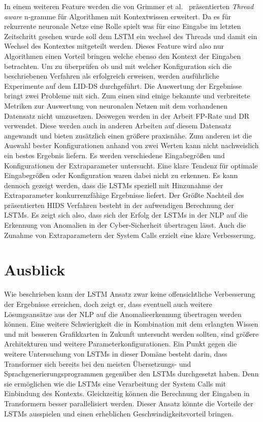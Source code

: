 In einem weiteren Feature werden die von Grimmer et al.~\cite{IDSTHREADGRIMMER2021} präsentierten \textit{Thread aware} n-gramme für Algorithmen mit Kontextwissen erweitert.
Da es für rekurrente neuronale Netze eine Rolle spielt was für eine Eingabe im letzten Zeitschritt gesehen wurde soll dem \ac{LSTM} ein wechsel des Threads und damit ein Wechsel des Kontextes mitgeteilt werden.
Dieses Feature wird also nur Algorithmen einen Vorteil bringen welche ebenso den Kontext der Eingaben betrachten.
Um zu überprüfen ob und mit welcher Konfiguration sich die beschriebenen Verfahren als erfolgreich erweisen, werden ausführliche Experimente auf dem \ac{LID-DS} durchgeführt.
Die Auswertung der Ergebnisse bringt zwei Probleme mit sich.
Zum einen sind einige bekannte und verbreitete Metriken zur Auswertung von neuronalen Netzen mit dem vorhandenen Datensatz nicht umzusetzen.
Deswegen werden in der Arbeit \ac{FP}-Rate und \ac{DR} verwendet. 
Diese werden auch in anderen Arbeiten auf diesem Datensatz angewandt und bieten zusätzlich einen größere praxisnähe.
Zum anderen ist die Auswahl bester Konfigurationen anhand von zwei Werten kann nicht nachweislich ein bestes Ergebnis liefern.
Es werden verschiedene Eingabegrößen und Konfigurationen der Extraparameter untersucht.
Eine klare Tendenz für optimale Eingabegrößen oder Konfiguration waren dabei nicht zu erkennen.
Es kann dennoch gezeigt werden, dass die \acp{LSTM} speziell mit Hinzunahme der Extraparameter konkurrenzfähige Ergebnisse liefert.
Der Größte Nachteil des präsentierten \ac{HIDS} Verfahren besteht in der aufwendigen Berechnung der \acp{LSTM}.
Es zeigt sich also, dass sich der Erfolg der \acp{LSTM} in der \ac{NLP} auf die Erkennung von Anomalien in der Cyber-Sicherheit übertragen lässt.
Auch die Zunahme von Extraparametern der System Calls erzielt eine klare Verbesserung.

\section{Ausblick}
Wie beschrieben kann der \ac{LSTM} Ansatz zwar keine offensichtliche Verbesserung der Ergebnisse erreichen, doch zeigt er, dass eventuell auch weitere Lösungsansätze aus der \ac{NLP} auf die Anomalieerkennung übertragen werden können.
Eine weitere Schwierigkeit die in Kombination mit dem erlangten Wissen und mit besseren Grafikkarten in Zukunft untersucht werden sollten, sind größere Architekturen und weitere Parameterkonfigurationen.
Ein Punkt gegen die weitere Untersuchung von \acp{LSTM} in dieser Domäne besteht darin, dass Transformer sich bereits bei den meisten Übersetzungs-  und Sprachgenerierungsprogrammen  gegenüber den \acp{LSTM} durchgesetzt haben. 
Denn sie ermöglichen wie die \acp{LSTM} eine Verarbeitung der System Calls mit Einbindung des Kontexts.
Gleichzeitig können die Berechnung der Eingaben in Transformern besser parallelisiert werden.
Dieser Ansatz könnte die Vorteile der \acp{LSTM} ausspielen und einen erheblichen Geschwindigkeitsvorteil bringen.

